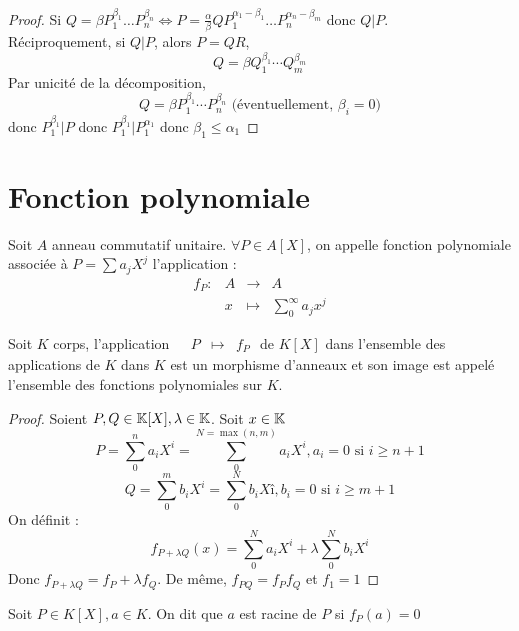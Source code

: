 \documentclass[]{report}
\begin{document}
    \begin{proof}
        Si $Q=\beta P_1^{\beta_1}\ldots P_n^{\beta_n}\iff P=\frac{\alpha}{\beta}Q P_1^{\alpha_1-\beta_1}\ldots P_n^{\alpha_n-\beta_m}$ donc $Q|P$.\\
        Réciproquement, si $Q|P$, alors $P=QR$,
        \[Q=\beta Q_1^{\beta_1}\cdots Q_m^{\beta_m}\]
        Par unicité de la décomposition,
        \[Q=\beta P_1^{\beta_1}\cdots P_n^{\beta_n}\text{ (éventuellement, $\beta_i=0$)}\]
        donc $P_1^{\beta_1}|P$ donc $P_1^{\beta_1}|P_1^{\alpha_1}$ donc $\beta_1\le \alpha_1$
    \end{proof}

    \section{Fonction polynomiale}

    \begin{df}{}{}
        Soit $A$ anneau commutatif unitaire. $\forall P\in A[X]$, on appelle fonction polynomiale associée à $P=\sum a_jX^j$ l'application : $$\begin{array}{ccccc}
    f_P : & A & \to & A \\
      & x & \mapsto & \sum_0^\infty a_jx^j
    \end{array}$$
    \end{df}

    \begin{prop}{}{}
        Soit $K$ corps, l'application $\begin{array}{ccccc}
    & P & \mapsto & f_P
    \end{array}$ de $K[X]$ dans l'ensemble des applications de $K$ dans $K$ est un morphisme d'anneaux et son image est appelé l'ensemble des fonctions polynomiales sur $K$.
    \end{prop}

    \begin{proof}
        Soient $P,Q\in \mathbb{K}[X],\lambda \in \mathbb{K}$. Soit $x\in\mathbb{K}$
        \[P=\sum_{0}^n a_i X^i=\sum_0^{N=\max(n,m)}a_i X^i,a_i=0\text{ si }i\ge n+1\]
        \[Q=\sum_0^m b_i X^i=\sum_0^N b_i Xî,b_i=0\text{ si }i\ge m+1\]
        On définit :
        \[f_{P+\lambda Q}(x)=\sum_0^N a_i X^i+ \lambda \sum_0^N b_i X^i\]
        Donc $f_{P+\lambda Q}=f_P+\lambda f_Q$. De même, $f_{PQ}=f_P f_Q$ et $f_1=1$
    \end{proof}

    \begin{df}{}{}
        Soit $P\in K[X],a\in K$. On dit que $a$ est racine de $P$ si $f_P(a)=0$
    \end{df}
\end{document}
